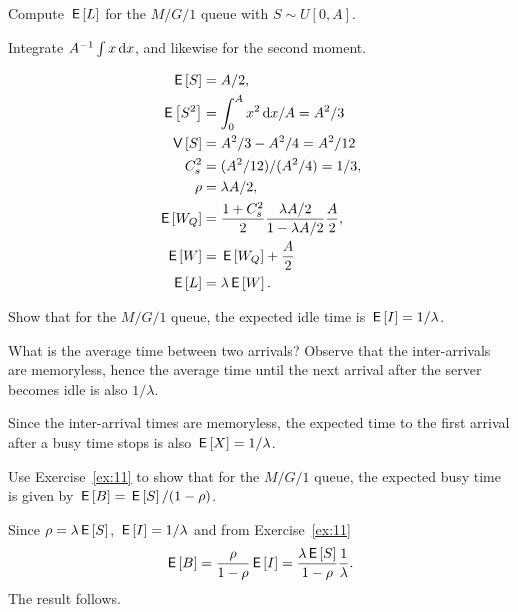 \begin{exercise}
  Compute $\,\mathsf{E}\left[L\right]$ for the $M/G/1$ queue with $S\sim U[0,A]$.
  \begin{hint}
Integrate $A^{-1} \int x \,\text{d}x$, and likewise for the second moment.
  \end{hint}
\begin{solution}
  \begin{align*}
\,\mathsf{E}\left[S\right] &= A/2,\\
\,\mathsf{E}\left[S^2\right] &= \int_0^A x^2 \,\text{d}x/A = A^2/3\\
\,\mathsf{V}\left[S\right] &= A^2/3 - A^2/4= A^2/12\\
C_s^2 &= (A^2/12)/(A^2/4) = 1/3,\\
\rho &= \lambda A/2,\\
\,\mathsf{E}\left[W_Q\right] &= \frac{1+C_s^2}2 \frac{\lambda A/2}{1-\lambda A/2}\frac A2, \\
\,\mathsf{E}\left[W\right] &= \,\mathsf{E}\left[W_Q\right] + \frac A2\\
\,\mathsf{E}\left[L\right] &= \lambda \,\mathsf{E}\left[W\right].
  \end{align*}
\end{solution}
\end{exercise}


\begin{exercise}
  Show that for the $M/G/1$ queue, the expected idle time is
  $\,\mathsf{E}\left[I\right] = 1/\lambda$.  
  \begin{hint}
What is the average time between two
    arrivals? Observe that the inter-arrivals are memoryless, hence the
    average time until the next arrival after the server becomes idle
    is also $1/\lambda$.
  \end{hint}
  \begin{solution}
  Since the inter-arrival times are memoryless, the expected
      time to the first arrival after a busy time stops is also
      $\,\mathsf{E}\left[X\right]=1/\lambda$.
  \end{solution}
\end{exercise}

\begin{exercise}
  Use Exercise~\ref{ex:11} to show that for the $M/G/1$ queue, the
  expected busy time is given by $\,\mathsf{E}\left[B\right] = \,\mathsf{E}\left[S\right]/(1-\rho)$.
  \begin{solution}
  Since $\rho = \lambda \,\mathsf{E}\left[S\right]$, $\,\mathsf{E}\left[I\right]= 1/\lambda$ and from Exercise~\ref{ex:11}
\begin{equation*}
  \,\mathsf{E}\left[B\right] = \frac{\rho }{1-\rho} \,\mathsf{E}\left[I\right] = \frac{\lambda \,\mathsf{E}\left[S\right]}{1-\rho} \frac1\lambda.
\end{equation*}
The result follows.
  \end{solution}
\end{exercise}

